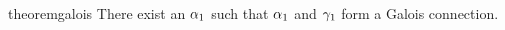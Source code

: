 %
%

\begin{restatable}{theorem}{galois}\label{thm:galios}
    There exist an $\alpha_1$ such that $\alpha_1$ and $\gamma_1$ form a Galois connection.
\end{restatable}
